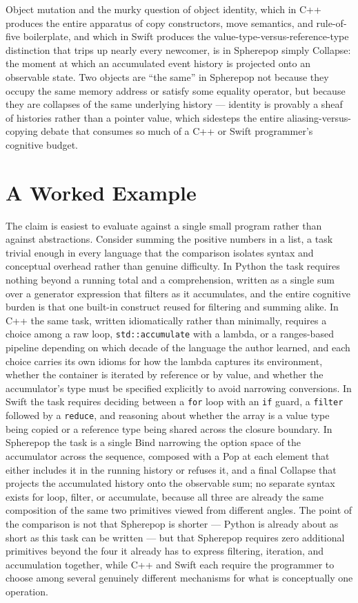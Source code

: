 \documentclass[11pt]{article}
\begin{document}
Object mutation and the murky question of object identity, which in C++ produces the entire apparatus of copy constructors, move semantics, and rule-of-five boilerplate, and which in Swift produces the value-type-versus-reference-type distinction that trips up nearly every newcomer, is in Spherepop simply Collapse: the moment at which an accumulated event history is projected onto an observable state. Two objects are ``the same'' in Spherepop not because they occupy the same memory address or satisfy some equality operator, but because they are collapses of the same underlying history --- identity is provably a sheaf of histories rather than a pointer value, which sidesteps the entire aliasing-versus-copying debate that consumes so much of a C++ or Swift programmer's cognitive budget.

\section{A Worked Example}

The claim is easiest to evaluate against a single small program rather than against abstractions. Consider summing the positive numbers in a list, a task trivial enough in every language that the comparison isolates syntax and conceptual overhead rather than genuine difficulty. In Python the task requires nothing beyond a running total and a comprehension, written as a single sum over a generator expression that filters as it accumulates, and the entire cognitive burden is that one built-in construct reused for filtering and summing alike. In C++ the same task, written idiomatically rather than minimally, requires a choice among a raw loop, \texttt{std::accumulate} with a lambda, or a ranges-based pipeline depending on which decade of the language the author learned, and each choice carries its own idioms for how the lambda captures its environment, whether the container is iterated by reference or by value, and whether the accumulator's type must be specified explicitly to avoid narrowing conversions. In Swift the task requires deciding between a \texttt{for} loop with an \texttt{if} guard, a \texttt{filter} followed by a \texttt{reduce}, and reasoning about whether the array is a value type being copied or a reference type being shared across the closure boundary. In Spherepop the task is a single Bind narrowing the option space of the accumulator across the sequence, composed with a Pop at each element that either includes it in the running history or refuses it, and a final Collapse that projects the accumulated history onto the observable sum; no separate syntax exists for loop, filter, or accumulate, because all three are already the same composition of the same two primitives viewed from different angles. The point of the comparison is not that Spherepop is shorter --- Python is already about as short as this task can be written --- but that Spherepop requires zero additional primitives beyond the four it already has to express filtering, iteration, and accumulation together, while C++ and Swift each require the programmer to choose among several genuinely different mechanisms for what is conceptually one operation.
\end{document}
